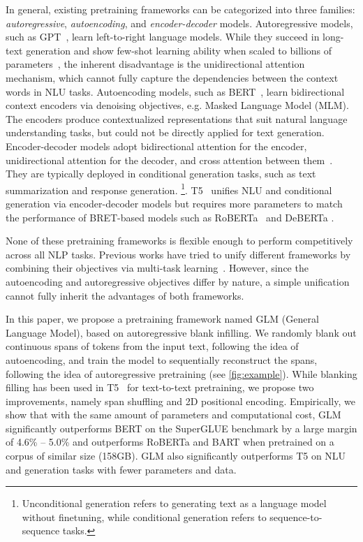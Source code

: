 In general, existing pretraining frameworks can be categorized into three families: \textit{autoregressive}, \textit{autoencoding}, and \textit{encoder-decoder} models. Autoregressive models, such as GPT~\cite{GPT2018a}, learn left-to-right language models. While they succeed in long-text generation and show few-shot learning ability when scaled to billions of parameters~\cite{GPT2-2018,GPT3-2020}, the inherent disadvantage is the unidirectional attention mechanism, which cannot fully capture the dependencies between the context words in NLU tasks. Autoencoding models, such as BERT~\cite{devlinBERT2019}, learn bidirectional context encoders via denoising objectives, e.g. Masked Language Model (MLM). The encoders produce contextualized representations that suit natural language understanding tasks, but could not be directly applied for text generation. Encoder-decoder models adopt bidirectional attention for the encoder, unidirectional attention for the decoder, and cross attention between them~\cite{songMASS2019,PALM2020,lewisBART2019}. They are typically deployed in conditional generation tasks, such as text summarization and response generation.
\footnote{Unconditional generation refers to generating text as a language model without finetuning, while conditional generation refers to sequence-to-sequence tasks.}. T5~\cite{raffelT52020} unifies NLU and conditional generation via encoder-decoder models but requires more parameters to match the performance of BRET-based models such as RoBERTa~\cite{RoBERTa} and DeBERTa \cite{He2021DeBERTaDB}. 

None of these pretraining frameworks is flexible enough to perform competitively across all NLP tasks. Previous works have tried to unify different frameworks by combining their objectives via multi-task learning~\cite{UniLM19,UniLMv220}. However, since the autoencoding and autoregressive objectives differ by nature, a simple unification cannot fully inherit the advantages of both frameworks.

In this paper, we propose a pretraining framework named GLM (General Language Model), based on autoregressive blank infilling. We randomly blank out continuous spans of tokens from the input text, following the idea of autoencoding, and train the model to sequentially reconstruct the spans, following the idea of autoregressive pretraining (see \ref{fig:example}). While blanking filling has been used in T5~\cite{raffelT52020} for text-to-text pretraining, we propose two improvements, namely span shuffling and 2D positional encoding. Empirically, we show that with the same amount of parameters and computational cost, GLM significantly outperforms BERT on the SuperGLUE benchmark by a large margin of 4.6\% -- 5.0\% and outperforms RoBERTa and BART when pretrained on a corpus of similar size (158GB). GLM also significantly outperforms T5 on NLU and generation tasks with fewer parameters and data.

